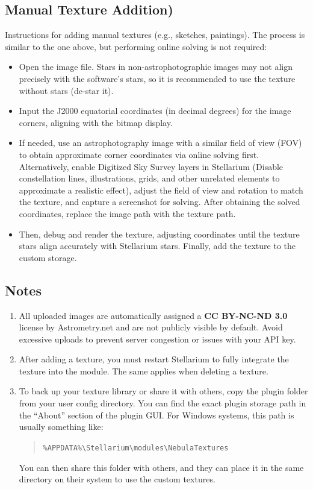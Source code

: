 \subsection{Manual Texture Addition)}
Instructions for adding manual textures (e.g., sketches, paintings). The process is similar to the one above, but performing online solving is not required:
\begin{itemize}
    \item Open the image file. Stars in non-astrophotographic images may not align precisely with the 
	software's stars, so it is recommended to use the texture without stars (de-star it).
    \item Input the J2000 equatorial coordinates (in decimal degrees) for the image corners, aligning 
	with the bitmap display.
    \item If needed, use an astrophotography image with a similar field of view (FOV) to obtain 
	approximate corner coordinates via online solving first. Alternatively, enable Digitized 
	Sky Survey layers in Stellarium (Disable constellation lines, illustrations, grids, and other 
	unrelated elements to approximate a realistic effect), adjust the field of view and rotation 
	to match the texture, and capture a screenshot for solving. After obtaining the solved 
	coordinates, replace the image path with the texture path.
    \item Then, debug and render the texture, adjusting coordinates until the texture stars align 
	accurately with Stellarium stars. Finally, add the texture to the custom storage.
\end{itemize}

\subsection{Notes}
\begin{enumerate}
    \item All uploaded images are automatically assigned a \textbf{CC BY-NC-ND 3.0} license by Astrometry.net 
	and are not publicly visible by default. Avoid excessive uploads to prevent server 
	congestion or issues with your API key.
    \item After adding a texture, you must restart Stellarium to fully integrate the texture into the 
	module. The same applies when deleting a texture.
    \item To back up your texture library or share it with others, copy the plugin folder from your user 
	config directory. You can find the exact plugin storage path in the ``About'' section of the plugin GUI. For Windows systems, this path is usually something like:
    \begin{quote}
    \texttt{\%APPDATA\%\textbackslash Stellarium\textbackslash modules\textbackslash NebulaTextures}
    \end{quote}
    You can then share this folder with others, and they can place it in the same directory on 
	their system to use the custom textures.
\end{enumerate}


